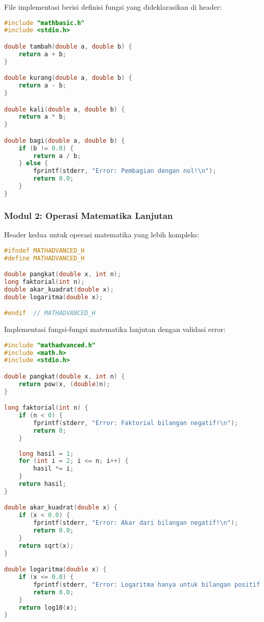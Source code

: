 \documentclass[../main.tex]{subfiles}
\begin{document}
File implementasi berisi definisi fungsi yang dideklarasikan di header:

\begin{lstlisting}[language=C, caption={mathbasic.c - implementasi operasi dasar}]
#include "mathbasic.h"
#include <stdio.h>

double tambah(double a, double b) {
    return a + b;
}

double kurang(double a, double b) {
    return a - b;
}

double kali(double a, double b) {
    return a * b;
}

double bagi(double a, double b) {
    if (b != 0.0) {
        return a / b;
    } else {
        fprintf(stderr, "Error: Pembagian dengan nol!\n");
        return 0.0;
    }
}
\end{lstlisting}

\subsubsection{Modul 2: Operasi Matematika Lanjutan}

Header kedua untuk operasi matematika yang lebih kompleks:

\begin{lstlisting}[language=C, caption={mathadvanced.h - header operasi lanjutan}]
#ifndef MATHADVANCED_H
#define MATHADVANCED_H

double pangkat(double x, int n);
long faktorial(int n);
double akar_kuadrat(double x);
double logaritma(double x);

#endif  // MATHADVANCED_H
\end{lstlisting}

Implementasi fungsi-fungsi matematika lanjutan dengan validasi error:

\begin{lstlisting}[language=C, caption={mathadvanced.c - implementasi operasi lanjutan}]
#include "mathadvanced.h"
#include <math.h>
#include <stdio.h>

double pangkat(double x, int n) {
    return pow(x, (double)n);
}

long faktorial(int n) {
    if (n < 0) {
        fprintf(stderr, "Error: Faktorial bilangan negatif!\n");
        return 0;
    }
    
    long hasil = 1;
    for (int i = 2; i <= n; i++) {
        hasil *= i;
    }
    return hasil;
}

double akar_kuadrat(double x) {
    if (x < 0.0) {
        fprintf(stderr, "Error: Akar dari bilangan negatif!\n");
        return 0.0;
    }
    return sqrt(x);
}

double logaritma(double x) {
    if (x <= 0.0) {
        fprintf(stderr, "Error: Logaritma hanya untuk bilangan positif!\n");
        return 0.0;
    }
    return log10(x);
}
\end{lstlisting}
\end{document}
